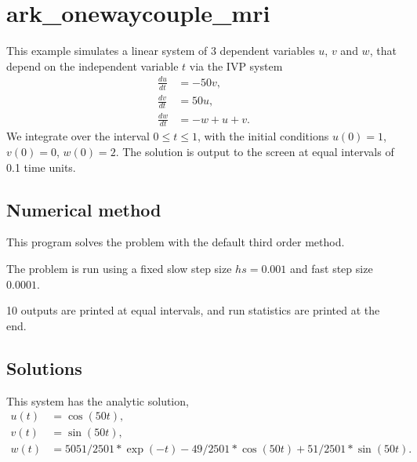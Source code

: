 \documentclass[letterpaper,10pt,english]{sphinxmanual}
\begin{document}
\section{ark\_onewaycouple\_mri}
\label{\detokenize{c_serial:ark-onewaycouple-mri}}\label{\detokenize{c_serial:id33}}
This example simulates a linear system of 3 dependent variables \(u\),
\(v\) and \(w\), that depend on the independent variable \(t\) via
the IVP system
\begin{equation*}
\begin{split}\frac{du}{dt} &= -50 v, \\
\frac{dv}{dt} &= 50 u, \\
\frac{dw}{dt} &= -w + u + v.\end{split}
\end{equation*}
We integrate over the interval \(0 \le t \le 1\), with the initial
conditions \(u(0) = 1\), \(v(0) = 0\), \(w(0)= 2\).  The
solution is output to the screen at equal intervals of 0.1 time units.


\subsection{Numerical method}
\label{\detokenize{c_serial:id34}}
This program solves the problem with the default third order method.

The problem is run using a fixed slow step size \(hs=0.001\) and fast step
size \(0.0001\).

10 outputs are printed at equal intervals, and run statistics
are printed at the end.


\subsection{Solutions}
\label{\detokenize{c_serial:id35}}
This system has the analytic solution,
\begin{equation*}
\begin{split}u(t) &= \cos(50t), \\
v(t) &= \sin(50t), \\
w(t) &= 5051/2501*\exp(-t) - 49/2501*\cos(50t) + 51/2501*\sin(50t).\end{split}
\end{equation*}
\end{document}
